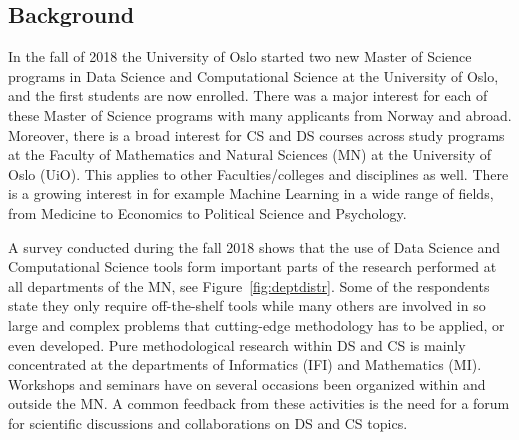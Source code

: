 \documentclass[a4paper,10pt]{article}
\begin{document}
\subsection{Background}
In the fall of 2018 the University of Oslo started two new Master of Science  programs in Data Science and Computational Science at the University of Oslo, and the first students are now enrolled. There was a major interest for each of these Master of Science programs with many applicants from Norway and abroad. Moreover, there is  a  broad interest for CS  and DS courses 
across study programs at the Faculty of Mathematics and Natural Sciences (MN) at the University of Oslo (UiO). This applies to other Faculties/colleges and disciplines as well. There is a growing interest in for example Machine Learning in a wide range of fields, from Medicine to Economics to Political Science and Psychology. 

A survey conducted during the fall 2018 shows that the use of Data Science and Computational Science tools form important parts of the research performed at all departments of the MN, see Figure~\ref{fig:deptdistr}. Some of the respondents state they only require off-the-shelf tools while many others are involved in so large and complex problems that cutting-edge methodology has to be applied, or even developed. Pure methodological research within DS and CS is mainly concentrated at the departments of Informatics (IFI) and Mathematics (MI). Workshops and seminars have on several occasions been organized within and outside the MN. A common feedback from these activities is the need for a forum for scientific discussions and collaborations on DS and CS topics.
\end{document}

